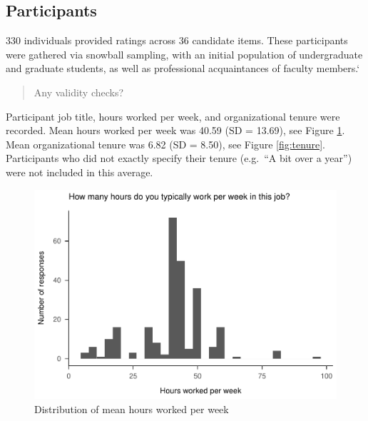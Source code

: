 \documentclass[
  english,
  man]{apa6}
\begin{document}
\hypertarget{participants}{%
\subsection{Participants}\label{participants}}

330 individuals provided ratings across 36 candidate items. These participants were gathered via snowball sampling, with an initial population of undergraduate and graduate students, as well as professional acquaintances of faculty members.`

\begin{quote}
Any validity checks?
\end{quote}

Participant job title, hours worked per week, and organizational tenure were recorded. Mean hours worked per week was 40.59 (SD = 13.69), see Figure \ref{fig:hours}. Mean organizational tenure was 6.82 (SD = 8.50), see Figure \ref{fig:tenure}. Participants who did not exactly specify their tenure (e.g.~``A bit over a year'') were not included in this average.

\begin{figure}
\centering
\includegraphics{SIOPpapaja_files/figure-latex/hours-1.pdf}
\caption{\label{fig:hours}Distribution of mean hours worked per week}
\end{figure}
\end{document}
